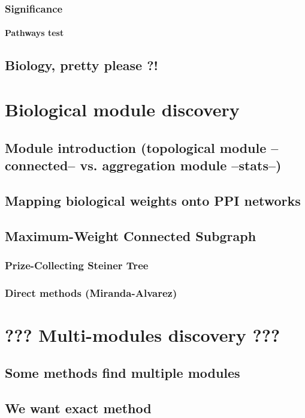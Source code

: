\documentclass[draft]{memoir}
\begin{document}
  \subsection{Significance}
   \subsubsection{Pathways test}

 \section{Biology, pretty please ?!}

\chapter{Biological module discovery}

 \section{Module introduction (topological module --connected-- vs. aggregation module --stats--)}
 \section{Mapping biological weights onto PPI networks}
 \section{Maximum-Weight Connected Subgraph}
  \subsection{Prize-Collecting Steiner Tree}
  \subsection{Direct methods (Miranda-Alvarez)}

\chapter{??? Multi-modules discovery ???}
 \section{Some methods find multiple modules}
 \section{We want exact method}
\end{document}
